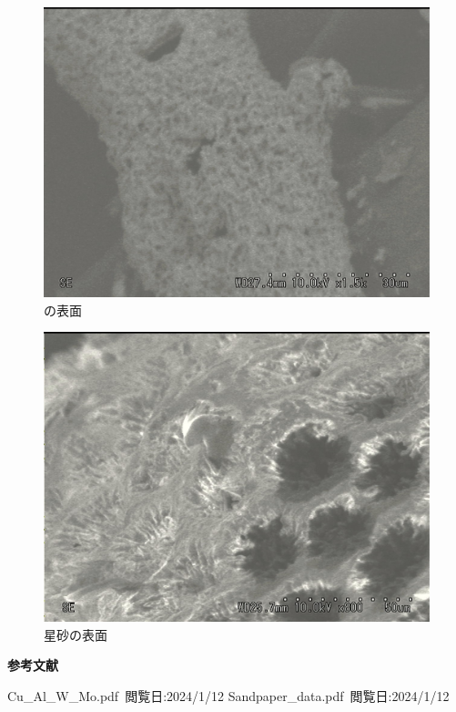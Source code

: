 \documentclass[a4paper,10.5pt]{ltjsarticle}
\begin{document}
\begin{figure}[h]
  \centering
  \includegraphics[scale=0.3]{figure2.jpg}
  \caption{の表面}
  \label{figure2}
\end{figure}
\begin{figure}[h]
  \centering
  \includegraphics[scale=0.3]{figure1.jpg}
  \caption{星砂の表面}
  \label{figure1}
\end{figure}
\clearpage
{\Large \bfseries 参考文献}
\begin{thebibliography}{1}
\vspace{-1.5cm}
   Cu\_Al\_W\_Mo.pdf\ 閲覧日:2024/1/12
   Sandpaper\_data.pdf\ 閲覧日:2024/1/12
\end{thebibliography}
\end{document}
